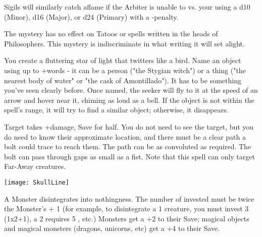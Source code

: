 {Sigils will similarly catch aflame if the Arbiter is unable to \RB vs. your \FOC using a d10 (Minor), d16 (Major), or d24 (Primary) with a -\DICE penalty.

The mystery has no effect on Tatoos or spells written in the heads of Philosophers.  This mystery is indiscriminate in what writing it will set alight.


\MYSTERY [
  Name = Sonorous Seeker,
  Link = arcana-mystery-sonorous-seeker,
  Paradigm = Prophesy,
  Save = N,
  Duration = \SUM Minutes,
  Target = See Below
]

You create a fluttering star of light that twitters like a bird.  Name an object using up to \DICE+\DICE words - it can be a person ("the Stygian witch") or a thing ("the nearest body of water" or "the cask of Amontillado").  It has to be something you've seen clearly before.  Once named, the seeker will fly to it at the speed of an arrow and hover near it, chiming as loud as a bell.  If the object is not within the spell's range, it will try to find a similar object; otherwise, it disappears.


\MYSTERY [
  Name = Doombolt,
  Link = arcana-mystery-doombolt,
  Paradigm = Force,
  Save = Y (half),
  Duration = Instant,
  Target = Far-Away Target(s)
]

Target takes \SUMDICE+\DICE damage, Save for half. You do not need to see the target, but you do need to know their approximate location, and there must be a clear path a bolt could trace to reach them. The path can be as convoluted as required. The bolt can pass through gaps as small as a fist.  Note that this spell can only target Far-Away creatures.

  \begin{center}
  \texttt{[image: SkullLine]}
  \end{center}



\MYSTERY [
  Name = Gaze of the Void,
  Link = arcana-mystery-gaze-of-the-void,
  Paradigm = Entropy,
  Save = Y (neg.),
  Duration = Instant,
  Target = Nearby or Far-Away Target(s)
]

A Monster disintegrates into nothingness. The number of \DICE invested must be twice the Monster's \HD + 1 (for example, to disintegrate a 1 \HD creature, you must invest 3 \DICE (1x2+1), a 2 \HD requires 5 \DICE, etc.) Monsters get a +2 to their Save; magical objects and magical monsters (dragons, unicorns, etc) get a +4 to their Save.



}
